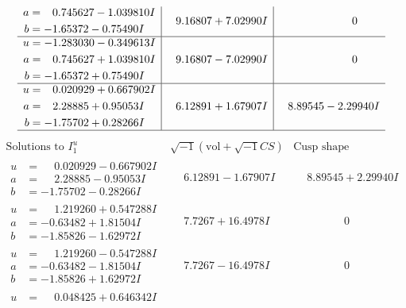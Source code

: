 \documentclass[1p]{elsarticle_modified}
\theoremstyle{definition}
\newcommand{\I}{\sqrt{-1}}
\begin{document}
$$\begin{array}{c|c|c}
\begin{aligned}
a &= \phantom{-}0.745627 - 1.039810 I \\
b &= -1.65372 - 0.75490 I\end{aligned}
 & \phantom{-}9.16807 + 7.02990 I & \phantom{-0.000000 } 0 \\ \hline\begin{aligned}
u &= -1.283030 - 0.349613 I \\
a &= \phantom{-}0.745627 + 1.039810 I \\
b &= -1.65372 + 0.75490 I\end{aligned}
 & \phantom{-}9.16807 - 7.02990 I & \phantom{-0.000000 } 0 \\ \hline\begin{aligned}
u &= \phantom{-}0.020929 + 0.667902 I \\
a &= \phantom{-}2.28885 + 0.95053 I \\
b &= -1.75702 + 0.28266 I\end{aligned}
 & \phantom{-}6.12891 + 1.67907 I & \phantom{-}8.89545 - 2.29940 I\\
 \hline 
 \end{array}$$\newpage$$\begin{array}{c|c|c}  
\text{Solutions to }I^u_{1}& \I (\text{vol} + \sqrt{-1}CS) & \text{Cusp shape}\\
 \hline 
\begin{aligned}
u &= \phantom{-}0.020929 - 0.667902 I \\
a &= \phantom{-}2.28885 - 0.95053 I \\
b &= -1.75702 - 0.28266 I\end{aligned}
 & \phantom{-}6.12891 - 1.67907 I & \phantom{-}8.89545 + 2.29940 I \\ \hline\begin{aligned}
u &= \phantom{-}1.219260 + 0.547288 I \\
a &= -0.63482 + 1.81504 I \\
b &= -1.85826 - 1.62972 I\end{aligned}
 & \phantom{-}7.7267 + 16.4978 I & \phantom{-0.000000 } 0 \\ \hline\begin{aligned}
u &= \phantom{-}1.219260 - 0.547288 I \\
a &= -0.63482 - 1.81504 I \\
b &= -1.85826 + 1.62972 I\end{aligned}
 & \phantom{-}7.7267 - 16.4978 I & \phantom{-0.000000 } 0 \\ \hline\begin{aligned}
u &= \phantom{-}0.048425 + 0.646342 I \\

\end{aligned}
\end{array}$$
\end{document}
